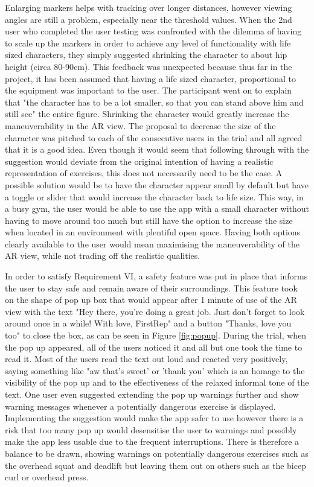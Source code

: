 \documentclass{l4proj}
\begin{document}
Enlarging markers helps with tracking over longer distances, however viewing angles are still a problem, especially near the threshold values. When the 2nd user who completed the user testing was confronted with the dilemma of having to scale up the markers in order to achieve any level of functionality with life sized characters, they simply suggested shrinking the character to about hip height (circa 80-90cm). This feedback was unexpected because thus far in the project, it has been assumed that having a life sized character, proportional to the equipment was important to the user. The participant went on to explain that "the character has to be a lot smaller, so that you can stand above him and still see" the entire figure. Shrinking the character would greatly increase the maneuverability in the AR view. The proposal to decrease the size of the character was pitched to each of the consecutive users in the trial and all agreed that it is a good idea. Even though it would seem that following through with the suggestion would deviate from the original intention of having a realistic representation of exercises, this does not necessarily need to be the case. A possible solution would be to have the character appear small by default but have a toggle or slider that would increase the character back to life size. This way, in a busy gym, the user would be able to use the app with a small character without having to move around too much but still have the option to increase the size when located in an environment with plentiful open space. Having both options clearly available to the user would mean maximising the maneuverability of the AR view, while not trading off the realistic qualities. 

In order to satisfy Requirement VI, a safety feature was put in place that informs the user to stay safe and remain aware of their surroundings. This feature took on the shape of pop up box that would appear after 1 minute of use of the AR view with the text "Hey there, you're doing a great job. Just don't forget to look around once in a while! With love, FirstRep" and a button "Thanks, love you too" to close the box, as can be seen in Figure \ref{fig:popup}. During the trial, when the pop up appeared, all of the users noticed it and all but one took the time to read it. Most of the users read the text out loud and reacted very positively, saying something like "aw that's sweet' or 'thank you' which is an homage to the visibility of the pop up and to the effectiveness of the relaxed informal tone of the text. One user even suggested extending the pop up warnings further and show warning messages whenever a potentially dangerous exercise is displayed. Implementing the suggestion would make the app safer to use however there is a risk that too many pop up would desensitise the user to warnings and possibly make the app less usable due to the frequent interruptions. There is therefore a balance to be drawn, showing warnings on potentially dangerous exercises such as the overhead squat and deadlift but leaving them out on others such as the bicep curl or overhead press. 
\end{document}
